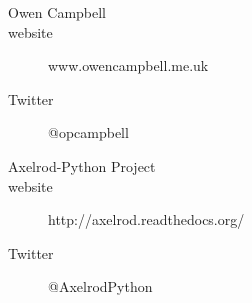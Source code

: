 
\begin{frame}{}

  \begin{description}
    \item [Owen Campbell]
    \item [website] www.owencampbell.me.uk
    \item [Twitter] @opcampbell
  \end{description}
  \vfill
  \begin{description}
    \item [Axelrod-Python Project]
    \item [website] http://axelrod.readthedocs.org/
    \item [Twitter] @AxelrodPython
  \end{description}
  \speakernote{
  }
\end{frame}
